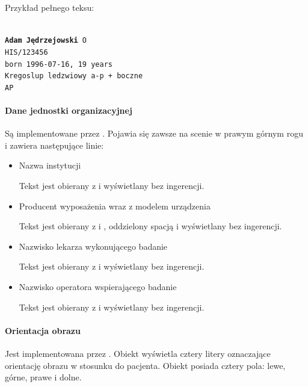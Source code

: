 Przykład pełnego teksu:

\texttt{\\
    \textbf{Adam Jędrzejowski} O\\
    HIS/123456\\
    born 1996-07-16, 19 years\\
    Kregoslup ledzwiowy a-p + boczne\\
    AP
}

\paragraph{Dane jednostki organizacyjnej}

Są implementowane przez .
Pojawia się zawsze na scenie w prawym górnym rogu i zawiera następujące linie:
\begin{itemize}
    \item Nazwa instytucji

          Tekst jest obierany z  i wyświetlany bez ingerencji.

    \item Producent wyposażenia wraz z modelem urządzenia

          Tekst jest obierany z  i , oddzielony spacją i wyświetlany bez ingerencji.

    \item Nazwisko lekarza wykonującego badanie

          Tekst jest obierany z  i wyświetlany bez ingerencji.

    \item Nazwisko operatora wspierającego badanie

          Tekst jest obierany z  i wyświetlany bez ingerencji.
\end{itemize}

\paragraph{Orientacja obrazu}

\par
Jest implementowana przez .
Obiekt wyświetla cztery litery oznaczające orientację obrazu w stosunku do pacjenta.
Obiekt posiada cztery pola: lewe, górne, prawe i dolne.

